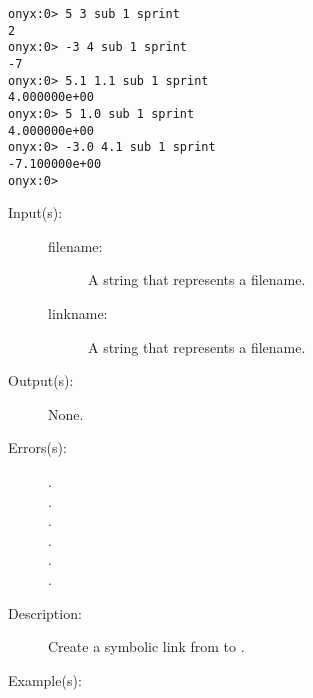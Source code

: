 \begin{description}
\begin{description}
\begin{verbatim}
onyx:0> 5 3 sub 1 sprint
2
onyx:0> -3 4 sub 1 sprint
-7
onyx:0> 5.1 1.1 sub 1 sprint
4.000000e+00
onyx:0> 5 1.0 sub 1 sprint
4.000000e+00
onyx:0> -3.0 4.1 sub 1 sprint
-7.100000e+00
onyx:0>
		\end{verbatim}
	\end{description}
\label{systemdict:symlink}
\item[{\onyxop{filename linkname}{symlink}{--}}: ]
	\begin{description}\item[]
	\item[Input(s): ]
		\begin{description}\item[]
		\item[filename: ]
			A string that represents a filename.
		\item[linkname: ]
			A string that represents a filename.
		\end{description}
	\item[Output(s): ] None.
	\item[Errors(s): ]
		\begin{description}\item[]
		\item[.]
		\item[.]
		\item[.]
		\item[.]
		\item[.]
		\item[.]
		\end{description}
	\item[Description: ]
		Create a symbolic link from  to
		.
	\item[Example(s): ]\begin{verbatim}


\end{verbatim}
\end{description}
\end{description}

